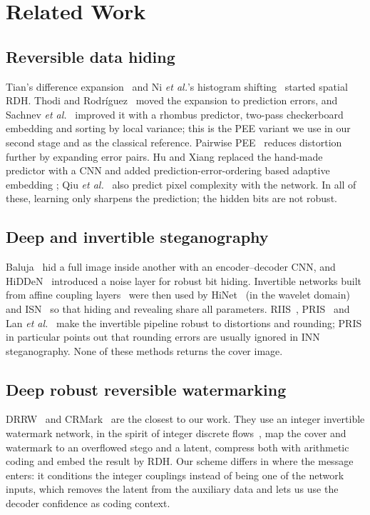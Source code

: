 \section{Related Work}
\subsection{Reversible data hiding}
Tian's difference expansion~\cite{tian2003de} and Ni \emph{et al.}'s histogram shifting~\cite{ni2006hs} started spatial
RDH. Thodi and Rodr\'iguez~\cite{thodi2007pee} moved the expansion to prediction errors, and Sachnev
\emph{et al.}~\cite{sachnev2009} improved it with a rhombus predictor, two-pass checkerboard embedding and sorting by local
variance; this is the PEE variant we use in our second stage and as the classical reference. Pairwise PEE~\cite{ou2013ppee}
reduces distortion further by expanding error pairs. Hu and Xiang replaced the hand-made predictor with a CNN
\cite{hu2021cnnp} and added prediction-error-ordering based adaptive embedding \cite{hu2022cnnpami}; Qiu
\emph{et al.}~\cite{qiu2025icnnp} also predict pixel complexity with the network. In all of these, learning only sharpens the
prediction; the hidden bits are not robust.

\subsection{Deep and invertible steganography}
Baluja~\cite{baluja2017} hid a full image inside another with an encoder--decoder CNN, and HiDDeN~\cite{zhu2018hidden}
introduced a noise layer for robust bit hiding. Invertible networks built from affine coupling layers~\cite{dinh2017realnvp}
were then used by HiNet~\cite{jing2021hinet} (in the wavelet domain) and ISN~\cite{lu2021isn} so that hiding and revealing
share all parameters. RIIS~\cite{xu2022riis}, PRIS~\cite{yang2023pris} and Lan \emph{et al.}~\cite{lan2023robust} make the
invertible pipeline robust to distortions and rounding; PRIS in particular points out that rounding errors are usually
ignored in INN steganography. None of these methods returns the cover image.

\subsection{Deep robust reversible watermarking}
DRRW~\cite{chen2025drrw} and CRMark~\cite{chen2025crmark} are the closest to our work. They use an integer invertible
watermark network, in the spirit of integer discrete flows~\cite{hoogeboom2019idf}, map the cover and watermark to an
overflowed stego and a latent, compress both with arithmetic coding and embed the result by RDH. Our scheme differs in
where the message enters: it conditions the integer couplings instead of being one of the network inputs, which removes
the latent from the auxiliary data and lets us use the decoder confidence as coding context.

